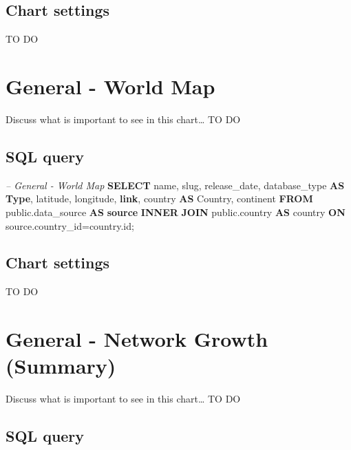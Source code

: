 \documentclass[]{book}
\newenvironment{Shaded}{\begin{snugshade}}{\end{snugshade}}
\newcommand{\KeywordTok}[1]{\textcolor[rgb]{0.13,0.29,0.53}{\textbf{#1}}}
\newcommand{\CommentTok}[1]{\textcolor[rgb]{0.56,0.35,0.01}{\textit{#1}}}
\newcommand{\NormalTok}[1]{#1}
\begin{document}
\subsection{Chart settings}\label{chart-settings-1}

TO DO

\section{General - World Map}\label{general---world-map}

Discuss what is important to see in this chart\ldots{} TO DO

\subsection{SQL query}\label{sql-query-1}

\begin{Shaded}
\begin{Highlighting}[]
\CommentTok{--    General - World Map}
\KeywordTok{SELECT}\NormalTok{  name,}
\NormalTok{        slug,}
\NormalTok{        release_date,}
\NormalTok{        database_type }\KeywordTok{AS} \KeywordTok{Type}\NormalTok{,}
\NormalTok{        latitude,}
\NormalTok{        longitude,}
        \KeywordTok{link}\NormalTok{,}
\NormalTok{        country }\KeywordTok{AS}\NormalTok{ Country,}
\NormalTok{        continent}
\KeywordTok{FROM}\NormalTok{ public.data_source }\KeywordTok{AS} \KeywordTok{source} \KeywordTok{INNER} \KeywordTok{JOIN}\NormalTok{ public.country }
  \KeywordTok{AS}\NormalTok{ country }\KeywordTok{ON}\NormalTok{ source.country_id=country.id;}
\end{Highlighting}
\end{Shaded}

\subsection{Chart settings}\label{chart-settings-2}

TO DO

\section{General - Network Growth
(Summary)}\label{general---network-growth-summary}

Discuss what is important to see in this chart\ldots{} TO DO

\subsection{SQL query}\label{sql-query-2}
\end{document}
